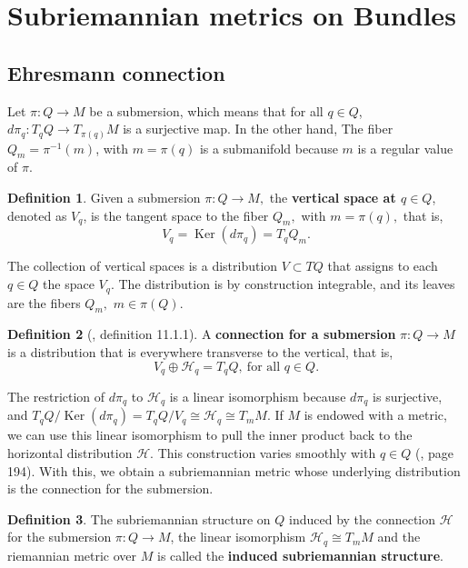 \documentclass[12pt, letterpaper, reqno]{amsart}
\theoremstyle{definition}
\newtheorem{df}{Definition}
\theoremstyle{plain}
\theoremstyle{remark}
\begin{document}
\section{Subriemannian metrics on Bundles}%
\label{sec:metrics_on_bundles}
\subsection{Ehresmann connection}%
\label{sub:ehresmann_connection}


Let $ \pi : Q \rightarrow {M} $ be a submersion, which means that for all $ q\in Q $, $ d\pi_q : T_q Q \rightarrow {T_{\pi(q)}}M $ is a surjective map. In the other hand, The fiber $ Q_m = \pi^{-1}(m) $, with $ m=\pi(q) $ is a submanifold because $ m $ is a regular value of $ \pi. $  

\begin{df}
	Given a submersion $ \pi:Q \rightarrow {M}, $ the \textbf{vertical space at $ q\in Q $}, denoted as $ V_q $, is the tangent space to the fiber $ Q_m, $ with $ m=\pi(q), $ that is,  
	$$ V_q = \operatorname{Ker}(d\pi_q) = T_q Q_m.  $$ 
\end{df}

The collection of vertical spaces is a distribution $ V \subset TQ $ that assigns to each $ q\in Q $ the space $ V_q. $ The distribution is by construction integrable, and its leaves are the fibers $ Q_m, $ $ m\in \pi(Q). $ 

\begin{df}[\cite{montgomery2002tour}, definition 11.1.1]
	A \textbf{connection for a submersion} $ \pi:Q \rightarrow {M} $ is a distribution that is everywhere transverse to the vertical, that is,  
	$$ V_q \oplus \mathcal{H}_q = T_q Q,\ \text{for all } q\in Q. $$ 
\end{df}

The restriction of $ d\pi_q $ to $ \mathcal{H}_q $ is a linear isomorphism because $ d\pi_q $ is surjective, and $ T_q Q / \operatorname{Ker}(d\pi_q) = T_q Q / V_q \cong \mathcal{H}_q \cong T_m M. $ If $ M $ is endowed with a metric, we can use this linear isomorphism to pull the inner product back to the horizontal distribution $ \mathcal{H}. $ This construction varies smoothly with $ q\in Q $ (\cite{montgomery2002tour}, page 194). With this, we obtain a subriemannian metric whose underlying distribution is the connection for the submersion.

\begin{df}
	The subriemannian structure on $ Q $ induced by the connection $ \mathcal{H} $ for the submersion $ \pi:Q \rightarrow {M} $, the linear isomorphism $ \mathcal{H}_q \cong T_m M $ and the riemannian metric over $ M $ is called the \textbf{induced subriemannian structure}. 
\end{df}
\end{document}
